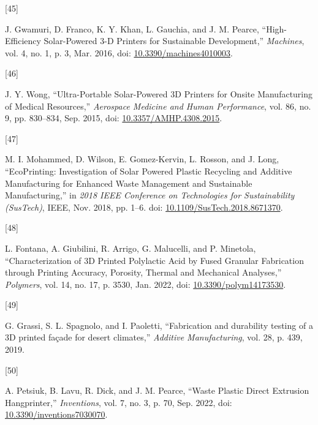 \documentclass[
]{article}
\newlength{\cslhangindent}
\newlength{\csllabelwidth}
\newlength{\cslentryspacingunit} %
\newenvironment{CSLReferences}[2] %
 {%
  \setlength{\parindent}{0pt}
  \ifodd #1
  \let\oldpar\par
  \def\par{\hangindent=\cslhangindent\oldpar}
  \fi
  \setlength{\parskip}{#2\cslentryspacingunit}
 }%
 {}
\newcommand{\CSLLeftMargin}[1]{\parbox[t]{\csllabelwidth}{#1}}
\newcommand{\CSLRightInline}[1]{\parbox[t]{\linewidth - \csllabelwidth}{#1}\break}
\begin{document}
\begin{CSLReferences}{0}{0}
\leavevmode{}%
\CSLLeftMargin{{[}45{]} }%
\CSLRightInline{J. Gwamuri, D. Franco, K. Y. Khan, L. Gauchia, and J. M.
Pearce, {``High-{Efficiency Solar-Powered} 3-{D Printers} for
{Sustainable Development},''} \emph{Machines}, vol. 4, no. 1, p. 3, Mar.
2016, doi:
\href{https://doi.org/10.3390/machines4010003}{10.3390/machines4010003}.}

\leavevmode{}%
\CSLLeftMargin{{[}46{]} }%
\CSLRightInline{J. Y. Wong, {``Ultra-{Portable Solar-Powered 3D
Printers} for {Onsite Manufacturing} of {Medical Resources},''}
\emph{Aerospace Medicine and Human Performance}, vol. 86, no. 9, pp.
830--834, Sep. 2015, doi:
\href{https://doi.org/10.3357/AMHP.4308.2015}{10.3357/AMHP.4308.2015}.}

\leavevmode{}%
\CSLLeftMargin{{[}47{]} }%
\CSLRightInline{M. I. Mohammed, D. Wilson, E. Gomez-Kervin, L. Rosson,
and J. Long, {``{EcoPrinting}: {Investigation} of {Solar Powered Plastic
Recycling} and {Additive Manufacturing} for {Enhanced Waste Management}
and {Sustainable Manufacturing},''} in \emph{2018 {IEEE Conference} on
{Technologies} for {Sustainability} ({SusTech})}, {IEEE}, Nov. 2018, pp.
1--6. doi:
\href{https://doi.org/10.1109/SusTech.2018.8671370}{10.1109/SusTech.2018.8671370}.}

\leavevmode{}%
\CSLLeftMargin{{[}48{]} }%
\CSLRightInline{L. Fontana, A. Giubilini, R. Arrigo, G. Malucelli, and
P. Minetola, {``Characterization of {3D Printed Polylactic Acid} by
{Fused Granular Fabrication} through {Printing Accuracy}, {Porosity},
{Thermal} and {Mechanical Analyses},''} \emph{Polymers}, vol. 14, no.
17, p. 3530, Jan. 2022, doi:
\href{https://doi.org/10.3390/polym14173530}{10.3390/polym14173530}.}

\leavevmode{}%
\CSLLeftMargin{{[}49{]} }%
\CSLRightInline{G. Grassi, S. L. Spagnolo, and I. Paoletti,
{``Fabrication and durability testing of a {3D} printed façade for
desert climates,''} \emph{Additive Manufacturing}, vol. 28, p. 439,
2019.}

\leavevmode{}%
\CSLLeftMargin{{[}50{]} }%
\CSLRightInline{A. Petsiuk, B. Lavu, R. Dick, and J. M. Pearce, {``Waste
{Plastic Direct Extrusion Hangprinter},''} \emph{Inventions}, vol. 7,
no. 3, p. 70, Sep. 2022, doi:
\href{https://doi.org/10.3390/inventions7030070}{10.3390/inventions7030070}.}


\end{CSLReferences}
\end{document}
